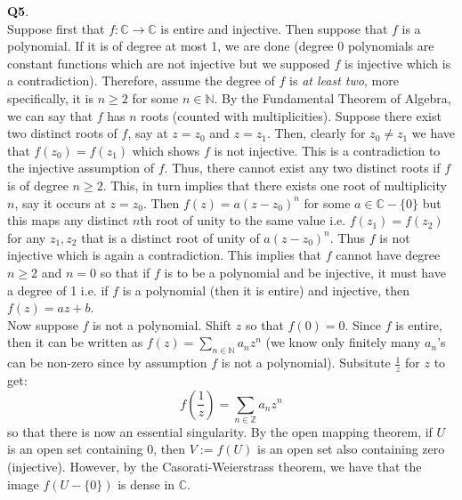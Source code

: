 \documentclass{article}
\begin{document}
    \textbf{Q5}.\\
    Suppose first that $f:\mathbb{C}\to\mathbb{C}$ is entire and injective. Then suppose that $f$ is a polynomial. If it is of degree
    at most 1, we are done (degree 0 polynomials are constant functions which are not injective but we supposed $f$ is injective which 
    is a contradiction). Therefore, assume the degree of $f$ is \textit{at least two}, more specifically, it is $n\geq 2$ for some
    $n\in\mathbb{N}$. By the Fundamental Theorem of Algebra, we can say that $f$ has $n$ roots (counted with multiplicities). Suppose
    there exist two distinct roots of $f$, say at $z=z_0$ and $z=z_1$. Then, clearly for $z_0\neq z_1$ we have that $f(z_0)=f(z_1)$
    which shows $f$ is not injective. This is a contradiction to the injective assumption of $f$. Thus, there cannot exist any two
    distinct roots if $f$ is of degree $n\geq 2$. This, in turn implies that there exists one root of multiplicity $n$, say it occurs
    at $z=z_0$. Then $f(z) = a(z-z_0)^n$ for some $a\in\mathbb{C}-\{0\}$ but this maps any distinct $n$th root of unity to the same
    value i.e. $f(z_1) = f(z_2)$ for any $z_1,z_2$ that is a distinct root of unity of $a(z-z_0)^n$. Thus $f$ is not injective which
    is again a contradiction. This implies that $f$ cannot have degree $n\geq 2$ and $n = 0$ so that if $f$ is to be a polynomial
    and be injective, it must have a degree of 1 i.e. if $f$ is a polynomial (then it is entire) and injective, then $f(z) = az+b$.\\
    Now suppose $f$ is not a polynomial. Shift $z$ so that $f(0) = 0$. Since $f$ is entire, then it can be written as 
    $f(z) = \sum_{n\in\mathbb{N}} a_nz^n$ (we know only finitely many $a_n$'s can be non-zero since by assumption $f$ is not 
    a polynomial).  Subsitute $\frac{1}{z}$ for $z$ to get:
    \[ f(\frac{1}{z}) = \sum_{n\in\mathbb{Z}} a_{n}z^{n} \]
    so that there is now an essential singularity. By the open mapping theorem, if $U$ is an open set containing 0, then $V := f(U)$
    is an open set also containing zero (injective). However, by the Casorati-Weierstrass theorem, we have that the image
    $f(U-\{0\})$ is dense in $\mathbb{C}$.
\end{document}
